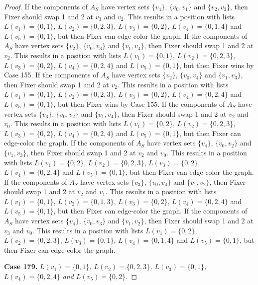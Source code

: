 \documentclass[12pt]{amsart}
\theoremstyle{plain}
\theoremstyle{definition}
\theoremstyle{remark}
\begin{document}
\begin{proof}
If the components of $A_S$ have vertex sets $\{v_4\}$, $\{v_0, v_1\}$ and $\{v_2, v_3\}$, then Fixer should swap 1 and 2 at $v_3$ and $v_2$. This results in a position with lists $L(v_1) = \{0, 1\}$, $L(v_2) = \{0, 2, 3\}$, $L(v_3) = \{0, 2\}$, $L(v_4) = \{0, 1, 4\}$ and $L(v_5) = \{0, 1\}$, but then Fixer can edge-color the graph.
If the components of $A_S$ have vertex sets $\{v_2\}$, $\{v_0, v_3\}$ and $\{v_1, v_4\}$, then Fixer should swap 1 and 2 at $v_2$. This results in a position with lists $L(v_1) = \{0, 1\}$, $L(v_2) = \{0, 2, 3\}$, $L(v_3) = \{0, 2\}$, $L(v_4) = \{0, 2, 4\}$ and $L(v_5) = \{0, 1\}$, but then Fixer wins by Case 155.
If the components of $A_S$ have vertex sets $\{v_2\}$, $\{v_0, v_4\}$ and $\{v_1, v_3\}$, then Fixer should swap 1 and 2 at $v_2$. This results in a position with lists $L(v_1) = \{0, 1\}$, $L(v_2) = \{0, 2, 3\}$, $L(v_3) = \{0, 2\}$, $L(v_4) = \{0, 2, 4\}$ and $L(v_5) = \{0, 1\}$, but then Fixer wins by Case 155.
If the components of $A_S$ have vertex sets $\{v_3\}$, $\{v_0, v_2\}$ and $\{v_1, v_4\}$, then Fixer should swap 1 and 2 at $v_2$ and $v_0$. This results in a position with lists $L(v_1) = \{0, 2\}$, $L(v_2) = \{0, 2, 3\}$, $L(v_3) = \{0, 2\}$, $L(v_4) = \{0, 2, 4\}$ and $L(v_5) = \{0, 1\}$, but then Fixer can edge-color the graph.
If the components of $A_S$ have vertex sets $\{v_4\}$, $\{v_0, v_2\}$ and $\{v_1, v_3\}$, then Fixer should swap 1 and 2 at $v_2$ and $v_0$. This results in a position with lists $L(v_1) = \{0, 2\}$, $L(v_2) = \{0, 2, 3\}$, $L(v_3) = \{0, 2\}$, $L(v_4) = \{0, 2, 4\}$ and $L(v_5) = \{0, 1\}$, but then Fixer can edge-color the graph.
If the components of $A_S$ have vertex sets $\{v_3\}$, $\{v_0, v_4\}$ and $\{v_1, v_2\}$, then Fixer should swap 1 and 2 at $v_2$ and $v_1$. This results in a position with lists $L(v_1) = \{0, 1\}$, $L(v_2) = \{0, 1, 3\}$, $L(v_3) = \{0, 2\}$, $L(v_4) = \{0, 2, 4\}$ and $L(v_5) = \{0, 1\}$, but then Fixer can edge-color the graph.
If the components of $A_S$ have vertex sets $\{v_4\}$, $\{v_0, v_3\}$ and $\{v_1, v_2\}$, then Fixer should swap 1 and 2 at $v_3$ and $v_0$. This results in a position with lists $L(v_1) = \{0, 2\}$, $L(v_2) = \{0, 2, 3\}$, $L(v_3) = \{0, 1\}$, $L(v_4) = \{0, 1, 4\}$ and $L(v_5) = \{0, 1\}$, but then Fixer can edge-color the graph.

\noindent\textbf{Case 179.  }\textit{$L(v_1) = \{0, 1\}$, $L(v_2) = \{0, 2, 3\}$, $L(v_3) = \{0, 1\}$, $L(v_4) = \{0, 2, 4\}$ and $L(v_5) = \{0, 2\}$.}


\end{proof}
\end{document}

